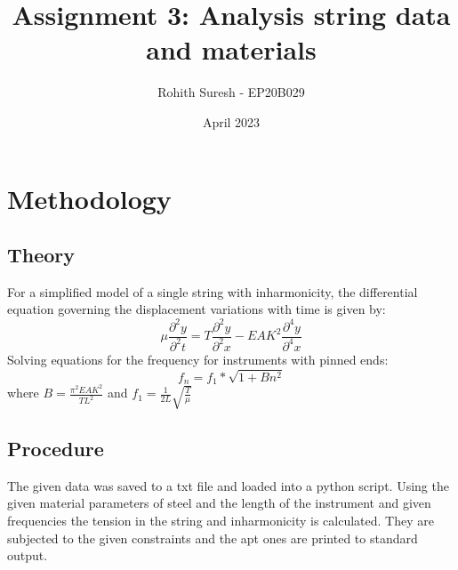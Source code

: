 \documentclass[a4paper,11pt]{article}
\title{\vspace{-3.5cm}\Huge{Assignment 3: Analysis string data and materials}}
\date{\vspace{-0.75cm}April 2023}
\author{\vspace{-3mm}Rohith Suresh - EP20B029}
\affil{\vspace{-3mm}Indian Institue Of Technology, Madras}
\begin{document}
\maketitle
\section*{Methodology}
\subsection*{Theory}
For a simplified model of a single string with inharmonicity, the differential equation governing the displacement variations with time is given by:
$$ {\mu}{\frac{\partial^2 y}{\partial^2 t}} = T{\frac{\partial^2 y}{\partial^2 x}} - EA{K^2}{\frac{\partial^4 y}{\partial^4 x}}$$
Solving equations for the frequency for instruments with pinned ends:
$$ f_n = f_1*\sqrt{1+B{n^2}} $$
where $ B = \frac{{\pi^2}{E}{A}{K^2}}{T{L^2}} $ and $f_1 = \frac{1}{2L}\sqrt{\frac{T}{\mu}}$

\subsection*{Procedure}
The given data was saved to a txt file and loaded into a python script. Using the given material parameters of steel and the length of the instrument and given frequencies the tension in the string and inharmonicity is calculated. They are subjected to the given constraints and the apt ones are printed to standard output.
\end{document}
